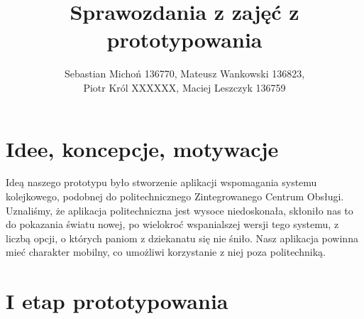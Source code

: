 \documentclass[12pt]{article}
\begin{document}
\title{Sprawozdania z zajęć z prototypowania}
\author{Sebastian Michoń 136770, Mateusz Wankowski 136823,\\ Piotr Król XXXXXX, Maciej Leszczyk 136759}
\date{\vspace{-3ex}}
\maketitle

\section{Idee, koncepcje, motywacje}
Ideą naszego prototypu było stworzenie aplikacji wspomagania systemu kolejkowego, podobnej do politechnicznego Zintegrowanego Centrum Obsługi. Uznaliśmy, że aplikacja politechniczna jest wysoce niedoskonała, skłoniło nas to do pokazania światu nowej, po wielokroć wspanialszej wersji tego systemu, z liczbą opcji, o których paniom z dziekanatu się nie śniło. Nasz aplikacja powinna mieć charakter mobilny, co umożliwi korzystanie z niej poza politechniką.

\section{I etap prototypowania}
\end{document}
